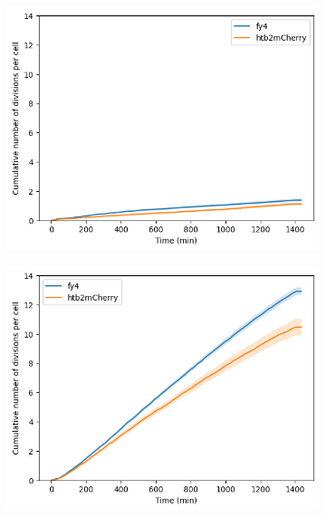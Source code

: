 \begin{figure}
  \begin{subfigure}[htpb]{0.45\textwidth}
   \centering
   \includegraphics[width=\textwidth]{allstrains_31492_cumul}
   \caption{
   }
   \label{fig:biology-lowglc-cumul}
  \end{subfigure}%
  \begin{subfigure}[htpb]{0.45\textwidth}
   \centering
   \includegraphics[width=\textwidth]{allstrains_26643_cumul}
   \caption{
   }
   \label{fig:biology-highglc-cumul}
  \end{subfigure}


\end{figure}
